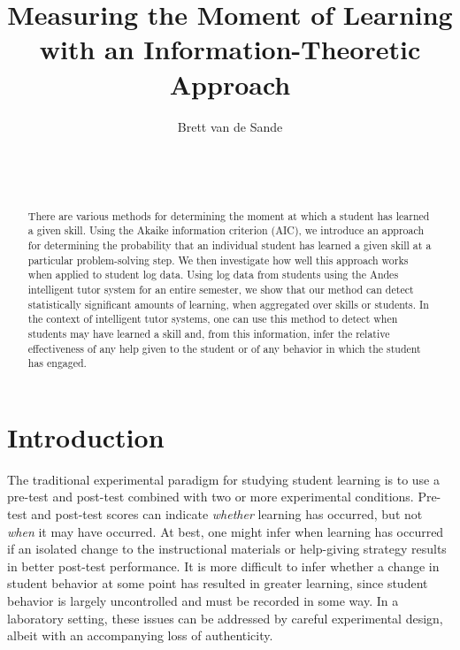 \documentclass{edm_template}
\begin{document}
\title{Measuring the Moment of Learning with an Information-Theoretic Approach}
\author{
\alignauthor
      Brett van de Sande\\
       \\
       \\
       \\
}

\maketitle
\begin{abstract}
There are various methods for determining the moment at which a
student has learned a given skill.  Using the Akaike information
criterion (AIC), we introduce an approach for determining the
probability that an individual student has learned a given skill at a
particular problem-solving step.  We then investigate how well this
approach works when applied to student log data.  Using log data from
students using the Andes intelligent tutor system for an entire
semester, we show that our method can detect statistically significant
amounts of learning, when aggregated over skills or students.  In the
context of intelligent tutor systems, one can use this method to
detect when students may have learned a skill and, from this
information, infer the relative effectiveness of any help given to the
student or of any behavior in which the student has engaged.
\end{abstract}



\section{Introduction}

%
%


The traditional experimental paradigm for studying student learning
is to use a pre-test and post-test combined with two or more experimental
conditions.  Pre-test and post-test scores can indicate {\em whether}
learning has occurred, but not {\em when} it may have occurred.  
At best, one might infer when learning has occurred if an isolated change to 
the instructional materials or help-giving strategy results in better
post-test performance.  
It is more difficult to infer whether a change in student behavior at
some point has resulted in greater learning, since student behavior is 
largely uncontrolled and must be recorded in some way.
In a laboratory setting, these issues can be addressed by careful
experimental design, albeit with an accompanying loss of authenticity.
\end{document}
